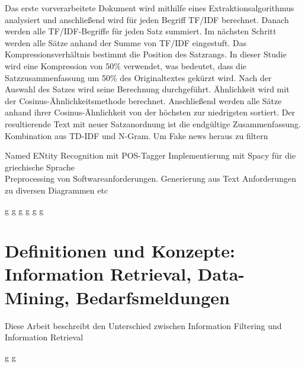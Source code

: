 Das erste vorverarbeitete Dokument wird mithilfe eines Extraktionsalgorithmus
analysiert und anschließend wird für jeden Begriff TF/IDF berechnet.
Danach werden alle TF/IDF-Begriffe für jeden Satz summiert.
Im nächsten Schritt werden alle Sätze anhand der Summe von TF/IDF eingestuft.
Das Kompressionsverhältnis bestimmt die Position des Satzrangs. In dieser Studie wird eine Kompression von 50\% verwendet, was bedeutet,
dass die Satzzusammenfassung um 50\% des Originaltextes gekürzt wird. Nach der Auswahl des Satzes wird seine Berechnung durchgeführt.
Ähnlichkeit wird mit der Cosinus-Ähnlichkeitsmethode berechnet. 
Anschließend werden alle Sätze anhand ihrer Cosinus-Ähnlichkeit von der höchsten zur niedrigsten sortiert.
Der resultierende Text mit
neuer Satzanordnung ist die endgültige Zusammenfassung.\cite{darmawan2015hybrid}\\


Kombination aus TD-IDF und N-Gram. Um Fake news heraus zu filtern\cite{suhasini2021hybrid}

Named ENtity Recognition mit POS-Tagger Implementierung mit Spacy für die griechische Sprache\cite{partalidou2019design}\\

Preprocessing von Softwareanforderungen. Generierung aus Text Anforderungen zu diversen Diagrammen etc \cite{kroha2000preprocessing}

\newpage
g
\newpage
g
\newpage
g
\newpage
g
\newpage
g
\newpage
g
\newpage

\section{Definitionen und Konzepte: Information Retrieval, Data-Mining, Bedarfsmeldungen}
\label{sec:definitionen-konzepte}

Diese Arbeit beschreibt den Unterschied zwischen Information Filtering und Information Retrieval\cite{belkin1992information}

\newpage
g
\newpage
g
\newpage





